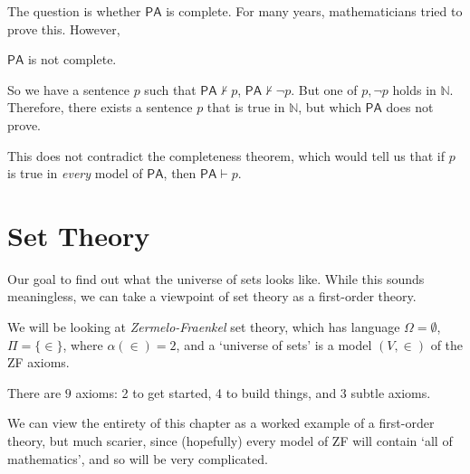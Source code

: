\documentclass[12pt]{article}
\begin{document}
The question is whether $\mathsf{PA}$ is complete. For many years, mathematicians tried to prove this. However,

\begin{theorem}
	$\mathsf{PA}$ is not complete.
\end{theorem}

So we have a sentence $p$ such that $\mathsf{PA} \not \vdash p$, $\mathsf{PA} \not \vdash \neg p$. But one of $p, \neg p$ holds in $\mathbb{N}$. Therefore, there exists a sentence $p$ that is true in $\mathbb{N}$, but which $\mathsf{PA}$ does not prove.

This does not contradict the completeness theorem, which would tell us that if $p$ is true in \emph{every} model of $\mathsf{PA}$, then $\mathsf{PA} \vdash p$.

\newpage

\section{Set Theory}
\label{sec:set_theory}

Our goal to find out what the universe of sets looks like. While this sounds meaningless, we can take a viewpoint of set theory as a first-order theory.

We will be looking at \emph{Zermelo-Fraenkel} set theory, which has language $\Omega = \emptyset$, $\Pi = \{\in\}$, where $\alpha(\in) = 2$, and a `universe of sets' is a model $(V, \in)$ of the ZF axioms.

There are $9$ axioms: 2 to get started, 4 to build things, and 3 subtle axioms.

We can view the entirety of this chapter as a worked example of a first-order theory, but much scarier, since (hopefully) every model of ZF will contain `all of mathematics', and so will be very complicated.
\end{document}

